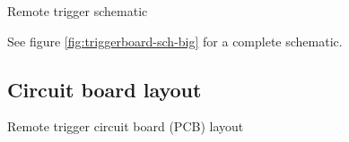{Remote trigger schematic}

See figure \ref{fig:triggerboard-sch-big} for a complete schematic.

\subsection{Circuit board layout}

{Remote trigger circuit board (PCB) layout}

